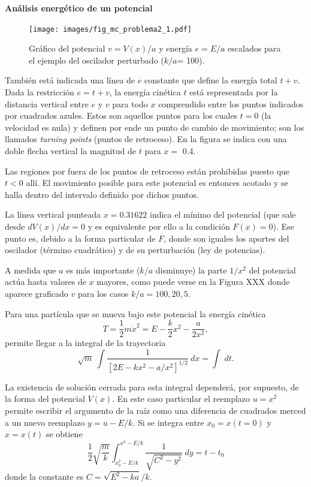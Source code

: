 \documentclass[10pt,oneside]{CBFT_book}
\begin{document}
\begin{ejemplo}{\bfseries Análisis energético de un potencial }
\begin{figure}[!ht]
	\begin{center}
	\texttt{[image: images/fig\_mc\_problema2\_1.pdf]}	
	\end{center}
	\vspace*{-5mm}
	\caption{Gráfico del potencial $v=V(x)/a$ y energía $e=E/a$ escalados para el ejemplo del oscilador perturbado 
	($ k/a $= 100).}
	\label{fig_mc_problema2_1}
\end{figure} 

También está indicada una línea de $ e $ constante que define la energía total $t + v$. Dada la restricción $ e = t + 
v$, la energía cinética $t$ está representada por la distancia vertical entre $e$ y $v$ para todo $x$ comprendido entre 
los puntos indicados por cuadrados azules. Estos son aquellos puntos para los cuales $t=0$ (la velocidad es nula) y 
definen por ende un punto de cambio de movimiento; son los llamados {\it turning points} (puntos de retroceso). 
En la figura se indica con una doble flecha vertical la magnitud de $t$ para $x =$ 0.4.

Las regiones por fuera de los puntos de retroceso están prohibidas puesto que $ t < 0 $ allí.
El movimiento posible para este potencial es entonces acotado y se halla dentro del intervalo definido por dichos 
puntos.

La línea vertical punteada $x=0.31622$ indica el mínimo del potencial (que sale desde $ dV(x)/dx = 0 $ y es 
equivalente por ello a la condición $ F(x)= 0 $). Ese punto es, debido a la forma particular de $F$, donde son iguales 
los aportes del oscilador (término cuadrático) y de su perturbación (ley de potencias).

A medida que $ a $ es más importante ($k/a$ disminuye) la parte $ 1 / x^2 $ del potencial actúa hasta valores de $ x $ 
mayores, como puede verse en la Figura XXX donde aparece graficado $v$ para los casos $ k/a = 100, 20, 5 $.


Para una partícula que se mueva bajo este potencial la energía cinética
\[
	T = \frac{1}{2} m \dot{x}^2 = E - \frac{k}{2} x^2 - \frac{a}{2 x^2},
\]
permite llegar a la integral de la trayectoria
\[
	\sqrt{m} \: \int \frac{1}{ \left[ 2E - kx^2 - a/x^2 \right]^{1/2} } \: dx = \int \; dt.
\]

La existencia de solución cerrada para esta integral dependerá, por supuesto, de la forma del potencial $V(x)$.
En este caso particular el reemplazo $ u = x^2 $ permite escribir el argumento de la raíz como una diferencia de
cuadrados merced a un nuevo reemplazo $ y = u - E/k $. 
Si se integra entre $ x_0 = x(t=0) $ y $ x = x(t) $ se obtiene 
\[
	\frac{1}{2}\sqrt{\frac{m}{k}} \int_{x_0^2 - E/k}^{{x^2 - E/k}} \frac{1}{\sqrt{C^2 - y^2}} \; dy = t - t_0
\]
donde la constante es $ C = \sqrt{E^2 - ka}/k $.


\end{ejemplo}
\end{document}
